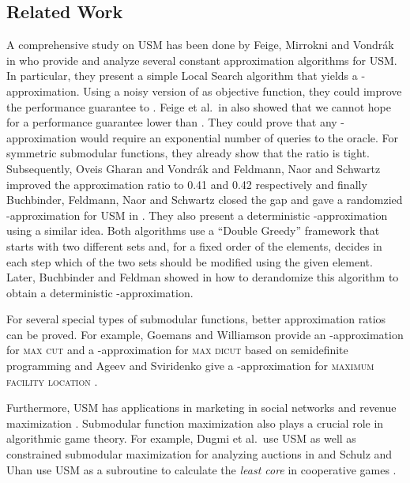 \documentclass{article}
\theoremstyle{plain}
\theoremstyle{definition}
\begin{document}
\subsection{Related Work}\label{sec:related-results}
A comprehensive study on USM has been done by Feige, Mirrokni and Vondr\'ak in \cite{LocalSearch} 
who provide and analyze several constant approximation algorithms for USM.
In particular, they present a simple Local Search algorithm that yields a -approximation.
Using a noisy version of  as objective function, they could improve the performance guarantee to .
Feige et al.\ in \cite{LocalSearch} also showed that we cannot hope for a performance guarantee lower than .
They could prove that any  -approximation would require an 
exponential number of queries to the oracle. For symmetric submodular functions, they already show that the ratio is tight.
Subsequently, Oveis Gharan and Vondr\'ak \cite{USMImprovement1} and Feldmann, Naor and Schwartz \cite{USMImprovement2} 
improved the approximation ratio to 0.41 and 0.42 respectively and finally Buchbinder, Feldmann, Naor 
and Schwartz closed the gap and gave a randomzied -approximation for USM in \cite{DoubleGreedy}.
They also present a deterministic -approximation using a similar idea. 
Both algorithms use a ``Double Greedy'' framework that starts with two different sets and, 
for a fixed order of the elements, decides in each step which of the two sets should be modified using the given element.
Later, Buchbinder and Feldman showed in \cite{DerandomizedDoubleGreedy} how to 
derandomize this algorithm to obtain a deterministic -approximation.

For several special types of submodular functions,
better approximation ratios can be proved.
For example, Goemans and Williamson \cite{MaxCut1} 
provide an -approximation for \textsc{max cut} and a -approximation for \textsc{max dicut} based on semidefinite programming and 
Ageev and Sviridenko give a -approximation for \textsc{maximum facility location} \cite{FacLoc1}. 


Furthermore, USM has applications in marketing in social networks and revenue maximization \cite{SocialNetworks}. 
Submodular function maximization also plays a crucial role in algorithmic game theory. 
For example, Dugmi et al.\ use USM as well as constrained submodular maximization for analyzing auctions in \cite{GameTheory1} and 
Schulz and Uhan use USM as a subroutine to calculate the \emph{least core} in cooperative games \cite{GameTheory2}.
\end{document}

